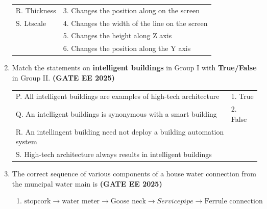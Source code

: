 \documentclass[journal,12pt,onecolumn]{IEEEtran}
\theoremstyle{remark}
\begin{document}
\begin{enumerate}
\begin{tabular}{p{}p{}}
 R. Thickness & 3. Changes the position along on the screen\\
 S. Ltscale & 4. Changes the width of the line on the screen\\
   & 5. Changes the height along Z axis\\
   & 6. Changes the position along the Y axis\\
\end{tabular}
\begin{enumerate}
\end{enumerate}
\item Match the statements on \textbf{intelligent buildings} in Group I with \textbf{True/False} in Group II. \hfill \textbf{(GATE EE 2025)}
\newline
\begin{tabular}{p{}p{}}
 P. All intelligent buildings are examples of high-tech architecture    &  1. True \\
 Q. An intelligent buildings is synonymous with a smart building    & 2. False\\
 R. An intellingent building need not deploy a building automation system &  \\
 S. High-tech architecture always results in intelligent buildings & \\
 \end{tabular}
 \begin{enumerate}
 \end{enumerate}
 \item The correct sequence of various components of a house water connection from the muncipal water main is \hfill \textbf{(GATE EE 2025)}
 \begin{enumerate}
     \item $\text{stopcork} \longrightarrow\text{water meter} \longrightarrow\text{Goose neck} \longrightarrow{Service pipe}\longrightarrow \text{Ferrule connection}$

\end{enumerate}
\end{enumerate}
\end{document}
